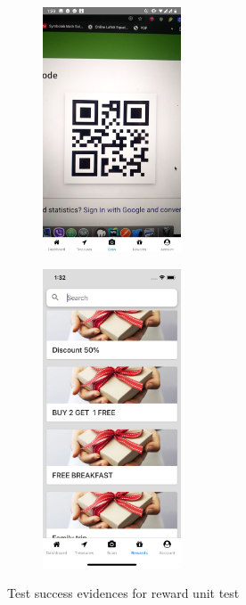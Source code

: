 \documentclass[12pt, a4paper, oneside]{article}
\begin{document}
\begin{figure}[H]
\begin{subfigure}{.5\textwidth}
    \centering
    \includegraphics[width=0.45\textwidth]{test-evidences/reward/e.png}
    \caption{}
\end{subfigure}%
\begin{subfigure}{.5\textwidth}
    \centering
    \includegraphics[width=0.45\textwidth]{test-evidences/reward/f.png}
    \caption{}
\end{subfigure}


\caption{Test success evidences for reward unit test}
\label{fig:test-evidence-reward}
\end{figure}
\end{document}
